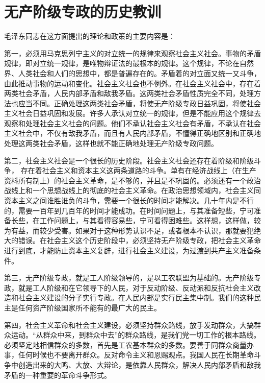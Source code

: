 \section[无产阶级专政的历史教训（一九六四年七月十四日）]{无产阶级专政的历史教训}


毛泽东同志在这方面提出的理论和政策的主要内容是：

第一，必须用马克思列宁主义的对立统一的规律来观察社会主义社会。事物的矛盾规律，即对立统一规律，是唯物辩证法的最根本的规律。这个规律，不论在自然界、人类社会和人们的思想中，都是普遍存在的。矛盾着的对立面又统一又斗争，由此推动事物的运动和变化。社会主义社会也不例外。在社会主义社会中，存在着两类社会矛盾，人民内部矛盾和敌我矛盾。这两类社会矛盾性质完全不同，处理方法也应当不同。正确处理这两类社会矛盾，将使无产阶级专政日益巩固，将使社会主义社会日益巩固和发展。许多人承认对立统一的规律，但是不能应用这个规律去观察和处理社会主义社会的问题。他们不承认社会主义社会有矛盾，不承认在社会主义社会中，不仅有敌我矛盾，而且有人民内部矛盾，不懂得正确地区别和正确地处理这两类社会矛盾，这样也就不能正确地处理无产阶级专政问题。

第二，社会主义社会是一个很长的历史阶段。社会主义社会还存在着阶级和阶级斗争， 存在着社会主义和资本主义这两条道路的斗争。单有在经济战线上（在生产资料所有制上）的社会主义革命，是不够的，并且是不巩固的。必须还有一个政治战线上和一个思想战线上的彻底的社会主义革命。在政治思想领域内，社会主义同资本主义之间谁胜谁负的斗争，需要一个很长的时间才能解决。几十年内是不行的，需要一百年到几百年的时间才能成功。在时间问题上，与其准备短些，宁可准备长些，在工作问题上，与其看得容易些，宁可看得困难些。这样想，这样做，较为有益，而较少受害。如果对于这种形势认识不足，或者根本不认识，那就要犯绝大的错误。在社会主义这个历史阶段中，必须坚持无产阶级专政，把社会主义革命进行到底，才能防止资本主义复辟，进行社会主义建设，为过渡到共产主义准备条件。

第三，无产阶级专政，就是工人阶级领导的，是以工农联盟为基础的。无产阶级专政，就是工人阶级和在它领导下的人民，对于反动阶级、反动派和反抗社会主义改造和社会主义建设的分子实行专政。在人民内部是实行民主集中制。我们的这种民主是任何资产阶级国家所不能有的最广大的民主。

第四，社会主义革命和社会主义建设，必须坚持群众路线，放手发动群众，大搞群众运动。“从群众中来，到群众中去”的群众路线，是我们党一切工作的根本路线。必须坚定地相信群众的多数，首先是工农基本群众的多数。要善于同群众商量办事，任何时候也不要离开群众。反对命令主义和恩赐观点。我国人民在长期革命斗争中创造出来的大鸣、大放、大辩论，是依靠人民群众，解决人民内部矛盾和敌我矛盾的一种重要的革命斗争形式。

